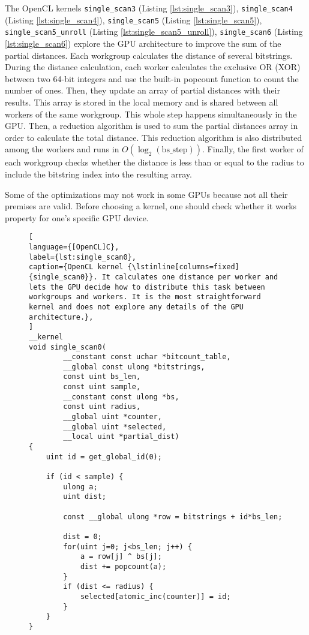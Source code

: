 The OpenCL kernels \lstinline{single_scan3} (Listing \ref{lst:single_scan3}), \lstinline{single_scan4} (Listing \ref{lst:single_scan4}), \lstinline{single_scan5} (Listing \ref{lst:single_scan5}), \lstinline{single_scan5_unroll} (Listing \ref{lst:single_scan5_unroll}), \lstinline{single_scan6} (Listing \ref{lst:single_scan6}) explore the GPU architecture to improve the sum of the partial distances. Each workgroup calculates the distance of several bitstrings. During the distance calculation, each worker calculates the exclusive OR (XOR) between two 64-bit integers and use the built-in popcount function to count the number of ones. Then, they update an array of partial distances with their results. This array is stored in the local memory and is shared between all workers of the same workgroup. This whole step happens simultaneously in the GPU. Then, a reduction algorithm is used to sum the partial distances array in order to calculate the total distance. This reduction algorithm is also distributed among the workers and runs in $O(\log_2(\text{bs\_step}))$. Finally, the first worker of each workgroup checks whether the distance is less than or equal to the radius to include the bitstring index into the resulting array.

Some of the optimizations may not work in some GPUs because not all their premises are valid. Before choosing a kernel, one should check whether it works property for one's specific GPU device.


\begin{figure}[!p]
\begin{lstlisting}[
language={[OpenCL]C},
label={lst:single_scan0},
caption={OpenCL kernel {\lstinline[columns=fixed]{single_scan0}}. It calculates one distance per worker and lets the GPU decide how to distribute this task between workgroups and workers. It is the most straightforward kernel and does not explore any details of the GPU architecture.},
]
__kernel
void single_scan0(
		__constant const uchar *bitcount_table,
		__global const ulong *bitstrings,
		const uint bs_len,
		const uint sample,
		__constant const ulong *bs,
		const uint radius,
		__global uint *counter,
		__global uint *selected,
		__local uint *partial_dist)
{
	uint id = get_global_id(0);

	if (id < sample) {
		ulong a;
		uint dist;

		const __global ulong *row = bitstrings + id*bs_len;

		dist = 0;
		for(uint j=0; j<bs_len; j++) {
			a = row[j] ^ bs[j];
			dist += popcount(a);
		}
		if (dist <= radius) {
			selected[atomic_inc(counter)] = id;
		}
	}
}
\end{lstlisting}
\end{figure}


